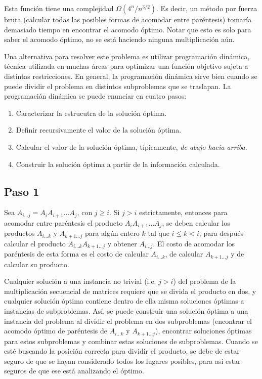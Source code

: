 \documentclass{article}
\begin{document}
Esta función tiene una complejidad $\Omega(4^n / n^{3/2}) $. Es decir, un método por fuerza bruta (calcular todas las posibles formas de acomodar entre paréntesis) tomaría demasiado tiempo en encontrar el acomodo óptimo. Notar que esto es solo para saber el acomodo óptimo, no se está haciendo ninguna multiplicación aún.

Una alternativa para resolver este problema es utilizar programación dinámica, técnica utilizada en muchas áreas para optimizar una función objetivo sujeta a distintas restricciones. En general, la programación dinámica sirve bien cuando se puede dividir el problema en distintos subproblemas que se traslapan. La programación dinámica se puede enunciar en cuatro pasos:

\begin{enumerate}
    \item Caracterizar la estrucutra de la solución óptima.
    \item Definir recursivamente el valor de la solución óptima.
    \item Calcular el valor de la solución óptima, típicamente, \textit{de abajo hacia arriba}.
    \item Construir la solución óptima a partir de la información calculada.
\end{enumerate}

\subsection*{Paso 1}

Sea $A_{i \hdots j} = A_i A_{i + 1} \hdots A_{j}$, con $j \geq i$. Si $j > i$ estrictamente, entonces para acomodar entre paréntesis el producto $A_i A_{i + 1} \hdots A_{j}$, se deben calcular los productos $A_{i \hdots k}$ y $A_{k + 1 \hdots j}$ para algún entero $k$ tal que $i \leq k < i$, para después calcular el producto $A_{i \hdots k} A_{k + 1 \hdots j}$ y obtener $A_{i \hdots j}$. El costo de acomodar los paréntesis de esta forma es el costo de calcular $A_{i \hdots k}$, de calcular $A_{k + 1 \hdots j}$ y de calcular su producto.

Cualquier solución a una instancia no trivial (i.e. $j > i$) del problema de la multiplicación secuencial de matrices requiere que se divida el producto en dos, y cualquier solución óptima contiene dentro de ella misma soluciones óptimas a instancias de subproblemas. Así, se puede construir una solución óptima a una instancia del problema al dividir el problema en dos subproblemas (encontrar el acomodo óptimo de paréntesis de $A_{i \hdots k}$ y $A_{k + 1 \hdots j}$), encontrar soluciones óptimas para estos subproblemas y combinar estas soluciones de subproblemas. Cuando se esté buscando la posición correcta para dividir el producto, se debe de estar seguro de que se hayan considerado todos los lugares posibles, para así estar seguros de que ese está analizando el óptimo.
\end{document}

